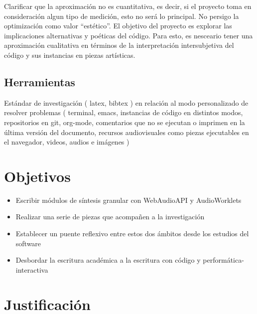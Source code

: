 Clarificar que la aproximación no es cuantitativa, es decir, si el proyecto toma en consideración algun tipo de medición, esto no será lo principal. No persigo la optimización como valor ``estético''. El objetivo del proyecto es explorar las implicaciones alternativas y poéticas del código. Para esto, es nesceario tener una aproximación cualitativa en términos de la interpretación intersubjetiva del código y sus instancias en piezas artísticas. 



\subsection{Herramientas}

Estándar de investigación ( latex, bibtex ) en relación al modo personalizado de resolver problemas ( terminal, emacs, instancias de código en distintos modos, repositorios en git, org-mode, comentarios que no se ejecutan o imprimen en la última versión del documento, recursos audiovisuales como piezas ejecutables en el navegador, videos, audios e imágenes )


\section{Objetivos}

\begin{itemize}
\item Escribir módulos de síntesis granular con WebAudioAPI y AudioWorklets
\item Realizar una serie de piezas que acompañen a la investigación
\item Establecer un puente reflexivo entre estos dos ámbitos desde los estudios del software
\item Desbordar la escritura académica a la escritura con código y performática-interactiva
\end{itemize}

\section{Justificación}

